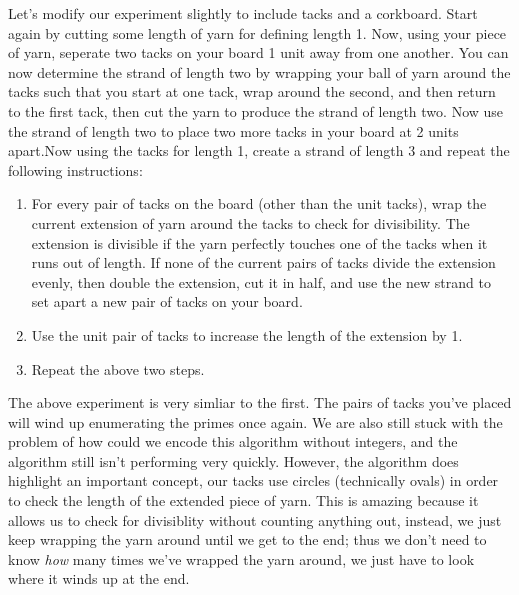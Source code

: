\documentclass[a4paper,12pt]{article}
\begin{document}
Let's modify our experiment slightly to include tacks and a corkboard. Start again by cutting some length of yarn for defining length 1. Now, using your piece of yarn, seperate two tacks on your board 1 unit away from one another. You can now determine the strand of length two by wrapping your ball of yarn around the tacks such that you start at one tack, wrap around the second, and then return to the first tack, then cut the yarn to produce the strand of length two. Now use the strand of length two to place two more tacks in your board at 2 units apart.Now using the tacks for length 1, create a strand of length 3 and repeat the following instructions:   
\begin{enumerate}
\item For every pair of tacks on the board (other than the unit tacks), wrap the current extension of yarn around the tacks to check for divisibility. The extension is divisible if the yarn perfectly touches one of the tacks when it runs out of length. If none of the current pairs of tacks divide the extension evenly, then double the extension, cut it in half, and use the new strand to set apart a new pair of tacks on your board.
\item Use the unit pair of tacks to increase the length of the extension by 1.
\item Repeat the above two steps.
\end{enumerate} 

The above experiment is very simliar to the first. The pairs of tacks you've placed will wind up enumerating the primes once again. We are also still stuck with the problem of how could we encode this algorithm without integers, and the algorithm still isn't performing very quickly. However, the algorithm does highlight an important concept, our tacks use circles (technically ovals) in order to check the length of the extended piece of yarn. This is amazing because it allows us to check for divisiblity without counting anything out, instead, we just keep wrapping the yarn around until we get to the end; thus we don't need to know \textit{how} many times we've wrapped the yarn around, we just have to look where it winds up at the end.   
\end{document}

